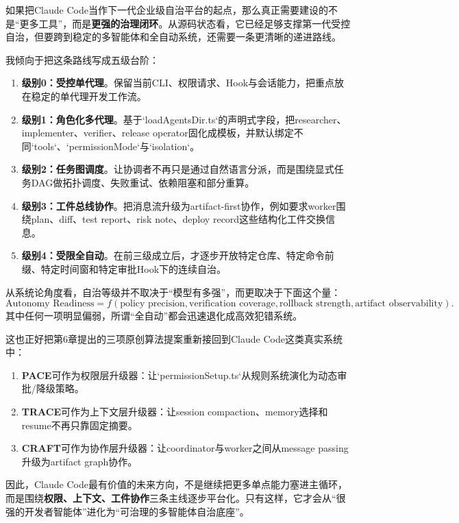 \documentclass[12pt,a4paper]{article}
\begin{document}
如果把Claude Code当作下一代企业级自治平台的起点，那么真正需要建设的不是“更多工具”，而是\textbf{更强的治理闭环}。从源码状态看，它已经足够支撑第一代受控自治，但要跨到稳定的多智能体和全自动系统，还需要一条更清晰的递进路线。

我倾向于把这条路线写成五级台阶：
\begin{enumerate}
    \item \textbf{级别0：受控单代理}。保留当前CLI、权限请求、Hook与会话能力，把重点放在稳定的单代理开发工作流。
    \item \textbf{级别1：角色化多代理}。基于`loadAgentsDir.ts`的声明式字段，把researcher、implementer、verifier、release operator固化成模板，并默认绑定不同`tools`、`permissionMode`与`isolation`。
    \item \textbf{级别2：任务图调度}。让协调者不再只是通过自然语言分派，而是围绕显式任务DAG做拓扑调度、失败重试、依赖阻塞和部分重算。
    \item \textbf{级别3：工件总线协作}。把消息流升级为artifact-first协作，例如要求worker围绕plan、diff、test report、risk note、deploy record这些结构化工件交换信息。
    \item \textbf{级别4：受限全自动}。在前三级成立后，才逐步开放特定仓库、特定命令前缀、特定时间窗和特定审批Hook下的连续自治。
\end{enumerate}

从系统论角度看，自治等级并不取决于“模型有多强”，而更取决于下面这个量：
\begin{equation}
\text{Autonomy Readiness}
=
f(\text{policy precision}, \text{verification coverage}, \text{rollback strength}, \text{artifact observability}).
\end{equation}
其中任何一项明显偏弱，所谓“全自动”都会迅速退化成高效犯错系统。

这也正好把第6章提出的三项原创算法提案重新接回到Claude Code这类真实系统中：
\begin{enumerate}
    \item \textbf{PACE}可作为权限层升级器：让`permissionSetup.ts`从规则系统演化为动态审批/降级策略。
    \item \textbf{TRACE}可作为上下文层升级器：让session compaction、memory选择和resume不再只靠固定摘要。
    \item \textbf{CRAFT}可作为协作层升级器：让coordinator与worker之间从message passing升级为artifact graph协作。
\end{enumerate}

因此，Claude Code最有价值的未来方向，不是继续把更多单点能力塞进主循环，而是围绕\textbf{权限、上下文、工件协作}三条主线逐步平台化。只有这样，它才会从“很强的开发者智能体”进化为“可治理的多智能体自治底座”。
\end{document}
